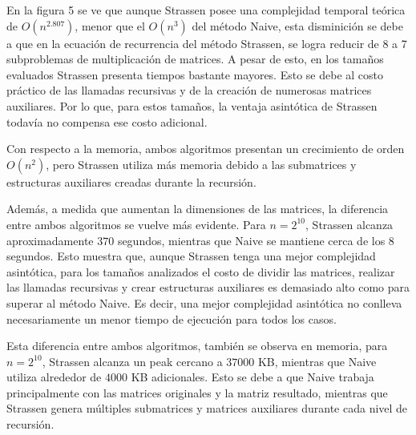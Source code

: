 En la figura 5 se ve que aunque Strassen posee una complejidad temporal teórica de $O(n^{2.807})$, menor que el $O(n^3)$ del método Naive, esta disminición se debe a que en la ecuación de recurrencia del método Strassen, se logra reducir de 8 a 7 subproblemas de multiplicación de matrices. A pesar de esto, en los tamaños evaluados Strassen presenta tiempos bastante mayores. Esto se debe al costo práctico de las llamadas recursivas y de la creación de numerosas matrices auxiliares. Por lo que, para estos tamaños, la ventaja asintótica de Strassen todavía no compensa ese costo adicional.

Con respecto a la memoria, ambos algoritmos presentan un crecimiento de orden $O(n^2)$, pero Strassen utiliza más memoria debido a las submatrices y estructuras auxiliares creadas durante la recursión.

Además, a medida que aumentan la dimensiones de las matrices, la diferencia entre ambos algoritmos se vuelve más evidente. Para $n=2^{10}$, Strassen alcanza aproximadamente $370$ segundos, mientras que Naive se mantiene cerca de los $8$ segundos. Esto muestra que, aunque Strassen tenga una mejor complejidad asintótica, para los tamaños analizados el costo de dividir las matrices, realizar las llamadas recursivas y crear estructuras auxiliares es demasiado alto como para superar al método Naive. Es decir, una mejor complejidad asintótica no conlleva necesariamente un menor tiempo de ejecución para todos los casos.

Esta diferencia entre ambos algoritmos, también se observa en memoria, para $n=2^{10}$, Strassen alcanza un peak cercano a $37000$ KB, mientras que Naive utiliza alrededor de $4000$ KB adicionales. Esto se debe a que Naive trabaja principalmente con las matrices originales y la matriz resultado, mientras que Strassen genera múltiples submatrices y matrices auxiliares durante cada nivel de recursión.
